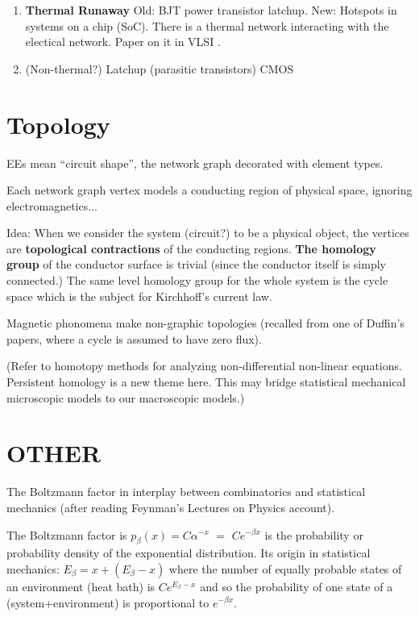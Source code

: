 \documentclass{article}
\begin{document}
\begin{enumerate}
\item
\textbf{Thermal Runaway} Old: BJT power transistor latchup.  New: Hotspots 
in systems on a chip (SoC). There is a thermal network interacting with the 
electical network. Paper on it in VLSI \cite{ThermalVLSI}.

\item (Non-thermal?) Latchup (parasitic transistors) 
CMOS\cite{CMOSLatchUpTINote}

\end{enumerate}

\section{Topology}

EEs mean ``circuit shape'', the network graph decorated with 
element types.

Each network graph vertex models a conducting region of physical space, 
ignoring electromagnetics...

Idea: When we consider the system (circuit?) to be a physical object, the 
vertices are \textbf{topological contractions} of the conducting regions.
\textbf{The homology group} of the conductor surface is trivial (since the
conductor itself is simply connected.)   The same level homology group for 
the whole system is the cycle space which is the subject for Kirchhoff's 
current law.

Magnetic phonomena make non-graphic topologies (recalled from one of 
Duffin's papers, where a cycle is assumed to have zero flux).

(Refer to homotopy methods for analyzing non-differential non-linear 
equations.  Persistent homology is a new theme here.  This may bridge
statistical mechanical microscopic models to our macroscopic models.)

\section{OTHER}

The Boltzmann factor in interplay between combinatorics and statistical
mechanics (after reading Feynman's Lectures on Physics account).

The Boltzmann factor is 
$p_{\beta}(x)= C\alpha^{-x}$ $=$ $Ce^{-\beta x}$ is the probability 
or probability density of the exponential distribution.
Its origin in statistical mechanics:  $E_\beta = x + (E_\beta-x)$ where the 
number of equally probable states of an environment (heat bath) 
is $Ce^{E_\beta - x}$ and so the probability of one state of a 
(system+environment) is proportional to $e^{-\beta x}$.
\end{document}
